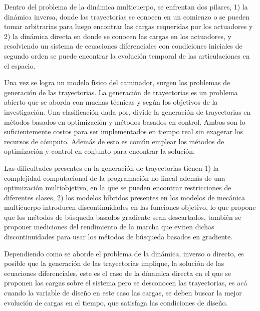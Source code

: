 Dentro del problema de la din\'amica multicuerpo, se enfrentan dos pilares, 1) la din\'amica inversa, donde las trayectorias se conocen en un comienzo o se pueden tomar arbitrarias para luego encontrar las cargas requeridas por los actuadores y 2) la din\'amica directa en donde se conocen las cargas en los actuadores, y resolviendo un sistema de ecuaciones diferenciales con condiciones iniciales de segundo orden se puede encontrar la evoluci\'on temporal de las articulaciones en el espacio.\par
Una vez se logra un modelo f\'isico del caminador, surgen los problemas de generaci\'on de las trayectorias. La generaci\'on de trayectorias es un problema abierto que se aborda con muchas t\'ecnicas y seg\'un los objetivos de la investigaci\'on\cite{Kherici2014,Mahmoodabadi2014}. Una clasificaci\'on dada por\cite{Xiang2010}, divide la generaci\'on de trayectorias en m\'etodos basados en optimizaci\'on y m\'etodos basados en control. Ambos son lo suficientemente costos para ser implementados en tiempo real sin exagerar los recursos de c\'omputo\cite{Mahmoodabadi2014}. Adem\'as de esto es com\'un emplear los m\'etodos de optimizaci\'on y control en conjunto para encontrar la soluci\'on.\par
Las dificultades presentes en la generaci\'on de trayectorias tienen 1) la complejidad computacional de la programaci\'on no-lineal adem\'as de una optimizaci\'on multiobjetivo, en la que se pueden encontrar restricciones de diferentes clases\cite{Mahmoodabadi2014}, 2) los modelos h\'ibridos presentes en los modelos de mec\'anica multicuerpo introducen discontinuidades en las funciones objetivo, lo que propone que los m\'etodos de b\'usqueda basados gradiente sean descartados\cite{Xiang2010}, tambi\'en se proponer mediciones del rendimiento de la marcha que eviten dichas discontinuidades para usar los m\'etodos de b\'usqueda basados en gradiente\cite{Xiang2010}.\par
Dependiendo como se aborde el problema de la din\'amica, inverso o directo, es posible que la generaci\'on de las trayectorias implique, la soluci\'on de las ecuaciones diferenciales, este es el caso de la d\'inamica directa en el que se proponen las cargas sobre el sistema pero se desconocen las trayectorias, es ac\'a cuando la variable de dise\~no en este caso las cargas, se deben buscar la mejor evoluci\'on de cargas en el tiempo, que satisfaga las condiciones de dise\~no.\par

